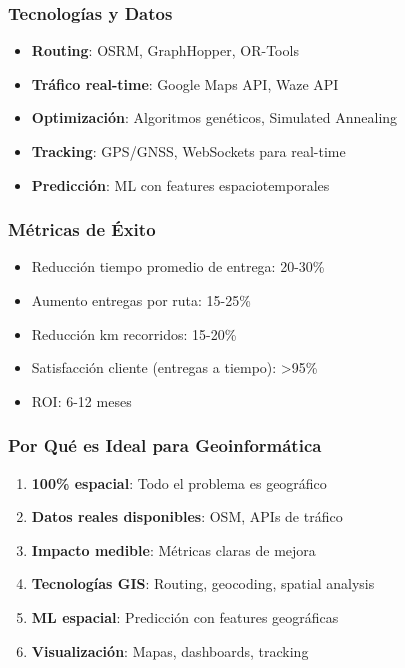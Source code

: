\documentclass[11pt,a4paper]{article}
\begin{document}
\subsubsection{Tecnologías y Datos}

\begin{itemize}
    \item \textbf{Routing}: OSRM, GraphHopper, OR-Tools
    \item \textbf{Tráfico real-time}: Google Maps API, Waze API
    \item \textbf{Optimización}: Algoritmos genéticos, Simulated Annealing
    \item \textbf{Tracking}: GPS/GNSS, WebSockets para real-time
    \item \textbf{Predicción}: ML con features espaciotemporales
\end{itemize}

\subsubsection{Métricas de Éxito}

\begin{itemize}
    \item Reducción tiempo promedio de entrega: 20-30\%
    \item Aumento entregas por ruta: 15-25\%
    \item Reducción km recorridos: 15-20\%
    \item Satisfacción cliente (entregas a tiempo): >95\%
    \item ROI: 6-12 meses
\end{itemize}

\subsubsection{Por Qué es Ideal para Geoinformática}

\begin{enumerate}
    \item \textbf{100\% espacial}: Todo el problema es geográfico
    \item \textbf{Datos reales disponibles}: OSM, APIs de tráfico
    \item \textbf{Impacto medible}: Métricas claras de mejora
    \item \textbf{Tecnologías GIS}: Routing, geocoding, spatial analysis
    \item \textbf{ML espacial}: Predicción con features geográficas
    \item \textbf{Visualización}: Mapas, dashboards, tracking
\end{enumerate}
\end{document}
